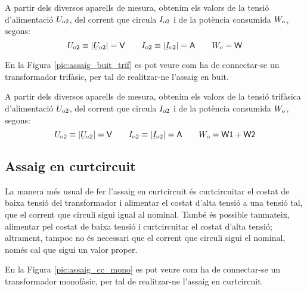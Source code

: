 A partir dels diversos aparells de mesura, obtenim els valors de la
tensió d'alimentació $U_\mathrm{o2}$, del corrent que circula
$I_\mathrm{o2}$ i de la potència consumida $W_\mathrm{o}$, segons:
\begin{equation}
    U\ped{o2}\equiv|\cmplx{U}\ped{o2}|=\textsf{V} \qquad
    I\ped{o2}\equiv|\cmplx{I}\ped{o2}|=\textsf{A}
    \qquad W\ped{o}=\textsf{W}
\end{equation}

En la Figura \vref{pic:assaig_buit_trif} es pot veure com ha de
connectar-se un transformador trifàsic, per tal de realitzar-ne l'assaig en buit.

\begin{center}
    
    \label{pic:assaig_buit_trif}
\end{center}


A partir dels diversos aparells de mesura, obtenim els valors de la
tensió trifàsica d'alimentació $U_\mathrm{o2}$, del corrent que circula
$I_\mathrm{o2}$ i de la potència consumida $W_\mathrm{o}$, segons:
\begin{equation}
    U\ped{o2}\equiv|\cmplx{U}\ped{o2}|=\textsf{V} \qquad
    I\ped{o2}\equiv|\cmplx{I}\ped{o2}|=\textsf{A} \qquad
    W\ped{o}=\textsf{W1}+\textsf{W2}
\end{equation}

\subsection{Assaig en curtcircuit}

La manera més usual de fer l'assaig en curtcircuit és
curtcircuitar el costat de baixa tensió del transformador i
alimentar el costat d'alta tensió a  una tensió tal, que el corrent
que circuli sigui igual al nominal. També és possible tanmateix,
alimentar pel costat de baixa tensió i curtcircuitar el costat
d'alta tensió; altrament, tampoc no és necessari que el corrent
que circuli sigui el nominal, només cal que sigui un valor proper.

En la Figura \vref{pic:assaig_cc_mono} es pot veure com ha de
connectar-se un transformador monofàsic, per tal de realitzar-ne l'assaig en curtcircuit.

\break
\begin{center}
    
    \label{pic:assaig_cc_mono} \
\end{center}


